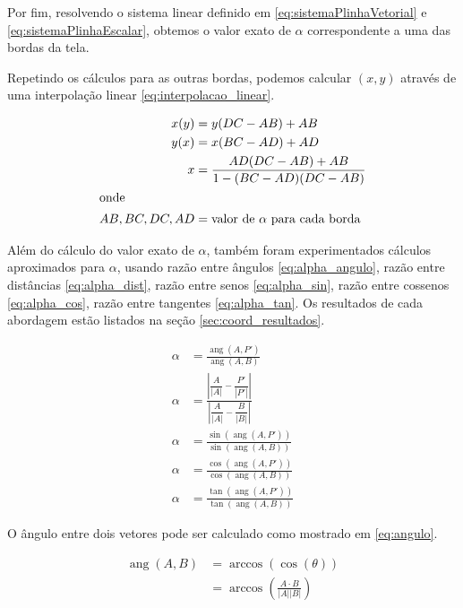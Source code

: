 \documentclass[brazil,pagestart=firstchapter]{abnt}
\DeclareMathOperator{\angulo}{ang}
\begin{document}
Por fim, resolvendo o sistema linear definido em
\eqref{eq:sistemaPlinhaVetorial} e \eqref{eq:sistemaPlinhaEscalar}, obtemos
o valor exato de $\alpha$ correspondente a uma das bordas da tela.

Repetindo os cálculos para as outras bordas, podemos calcular $(x,y)$
através de uma interpolação linear \eqref{eq:interpolacao_linear}.

\begin{align}
\label{eq:interpolacao_linear}
x(y) & = y (DC - AB) + AB  \\
y(x) & = x (BC - AD) + AD  \nonumber \\
x    & = \frac{AD  (DC - AB) + AB}{1 - (BC - AD)  (DC - AB)}  \nonumber \\
\intertext{onde}
AB, BC, DC, AD & = \text{valor de $\alpha$ para cada borda} \nonumber
\end{align}

Além do cálculo do valor exato de $\alpha$, também foram experimentados
cálculos aproximados para $\alpha$, usando
razão entre ângulos \eqref{eq:alpha_angulo},
razão entre distâncias \eqref{eq:alpha_dist},
razão entre senos \eqref{eq:alpha_sin},
razão entre cossenos \eqref{eq:alpha_cos},
razão entre tangentes \eqref{eq:alpha_tan}.
Os resultados de cada abordagem estão listados na seção
\ref{sec:coord_resultados}.

\begin{align}
\label{eq:alpha_angulo}
\alpha & = \frac{\angulo(A, P')}{\angulo(A, B)} \\
\label{eq:alpha_dist}
\alpha & = \frac{
		\left| \dfrac{A}{|A|} - \dfrac{P'}{|P'|} \right|
	}{
		\left| \dfrac{A}{|A|} - \dfrac{B }{|B |} \right|
	}  \\
\label{eq:alpha_sin}
\alpha & = \frac{\sin(\angulo(A, P'))}{\sin(\angulo(A, B))} \\
\label{eq:alpha_cos}
\alpha & = \frac{\cos(\angulo(A, P'))}{\cos(\angulo(A, B))} \\
\label{eq:alpha_tan}
\alpha & = \frac{\tan(\angulo(A, P'))}{\tan(\angulo(A, B))}
\end{align}

O ângulo entre dois vetores pode ser calculado como mostrado em
\eqref{eq:angulo}.

\begin{align}
\label{eq:angulo}
\angulo(A,B) & = \arccos( \cos(\theta) )    \\
             & = \arccos\left( \frac{A \cdot B}{|A||B|} \right)  \nonumber
\end{align}
\end{document}
